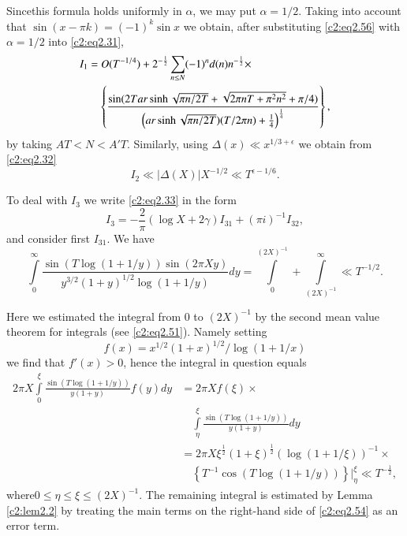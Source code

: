 Since\pageoriginale this formula holds uniformly in $\alpha$, we may
put $\alpha= 1/2$. Taking into account that $\sin (x- \pi k)= (-1)^k
\sin x$ we obtain, after substituting \eqref{c2:eq2.56} with $\alpha =
1/2$ into \eqref{c2:eq2.31},
\begin{align}
I_1 &= O (T^{-1/4}) + 2^{- \frac{1}{2}} \sum_{n \leq N} (-1)^n d(n) 
n^{- \frac{1}{2}}\times\notag\\ 
&\quad\left\{\frac{\sin (2 T ar \sinh \sqrt{\pi n/2T} + \sqrt{2 \pi n T+
    \pi^2 n^2} + \pi/4)}{\left(ar \sinh \sqrt{\pi n/2T}) (T/2\pi n)+
  \frac{1}{4}\right)^{\frac{1}{4}}} \right\},\label{c2:eq2.57}
\end{align}
by taking $AT < N < A'T$. Similarly, using $\Delta  (x) \ll x^{1/3+
  \epsilon}$ we obtain from \eqref{c2:eq2.32}
\begin{equation}
  I_2 \ll |\Delta  (X)|X^{-1/2} \ll T^{\epsilon -
    1/6}.\label{c2:eq2.58} 
\end{equation}

To deal with $I_3$ we write \eqref{c2:eq2.33} in the form
\begin{equation}
  I_3 = - \frac{2}{\pi} (\log X +2 \gamma) I_{31}+ (\pi i)^{-1}
  I_{32},\label{c2:eq2.59} 
\end{equation}
and consider first $I_{31}$. We have
$$
\int\limits_0^\infty \frac{\sin (T \log (1+1/y)) \sin (2 \pi
  Xy)}{y^{3/2} (1+y)^{1/2} \log (1+ 1/y)} dy = \int\limits_0^{(2
  X)^{-1}}+ \int\limits^\infty_{(2X)^{-1}} \ll T^{-1/2}.
$$

Here we estimated the integral from 0 to $(2X)^{-1}$ by the second
mean value theorem for integrals (see \eqref{c2:eq2.51}). Namely
setting
$$
f(x) = x^{1/2}(1+x)^{1/2}/\log(1+1/x)
$$
we find that $f'(x)> 0$, hence the integral in question equals
{\fontsize{10}{12}\selectfont
\begin{align*}
 2 \pi X \int\limits_0^\xi \frac{\sin (T \log (1+ 1/y))}{y(1+y)} f(y)
  dy &= 2 \pi X f(\xi)\times\\
&\quad\int\limits_\eta^\xi \frac{\sin (T\log (1+1/y))}{y(1+y)}dy\\ 
&= 2 \pi X \xi^{\frac{1}{2}}(1+ \xi)^{\frac{1}{2}} (\log (1+
  1/\xi))^{-1}\times\\ 
&\quad\left\{T^{-1} \cos (T \log (1+ 1/y))
  \right\}\Bigg|^\xi_\eta \ll T^{- \frac{1}{2}},
\end{align*}}
where\pageoriginale $0 \leq \eta \leq \xi \leq (2 X)^{-1}$. The
remaining integral is estimated by Lemma \ref{c2:lem2.2} by treating
the main terms on the right-hand side of \eqref{c2:eq2.54} as an error
term.

